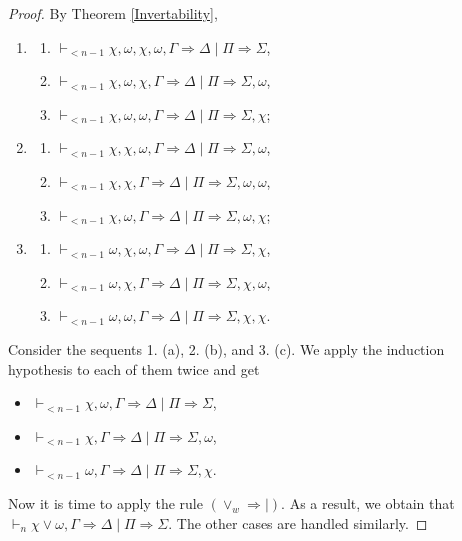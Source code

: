 \documentclass[11pt,a4paper,titlepage]{article}
\theoremstyle{definition}
\newcommand{\3}{\vspace{.3in}}
\newcommand{\2}{\vspace{.2in}}
\newcommand{\1}{\vspace{.1in}}
\newcommand{\5}{\vspace{.05in}}
\begin{document}
\begin{proof}
By Theorem \ref{Invertability}, \begin{enumerate}\itemsep=0pt
\item	\begin{enumerate}\itemsep=0pt
\item	$\vdash_{<n-1}  \chi,\omega,\chi,\omega,\Gamma\Rightarrow\Delta\mid \Pi\Rightarrow\Sigma $,
\item $\vdash_{<n-1}  \chi,\omega,\chi,\Gamma\Rightarrow\Delta\mid \Pi\Rightarrow\Sigma,\omega $, 
\item $\vdash_{<n-1}  \chi,\omega,\omega,\Gamma\Rightarrow\Delta\mid \Pi\Rightarrow\Sigma,\chi $;
\end{enumerate}
\item \begin{enumerate}\itemsep=0pt
\item $\vdash_{<n-1} \chi,\chi,\omega,\Gamma\Rightarrow\Delta\mid \Pi\Rightarrow\Sigma,\omega $,
\item $\vdash_{<n-1} \chi,\chi,\Gamma\Rightarrow\Delta\mid \Pi\Rightarrow\Sigma,\omega,\omega $,
\item $\vdash_{<n-1} \chi,\omega,\Gamma\Rightarrow\Delta\mid \Pi\Rightarrow\Sigma,\omega,\chi $;
\end{enumerate}
\item \begin{enumerate}\itemsep=0pt
	\item $\vdash_{<n-1} \omega,\chi,\omega,\Gamma\Rightarrow\Delta\mid \Pi\Rightarrow\Sigma,\chi $,
	\item $\vdash_{<n-1} \omega,\chi,\Gamma\Rightarrow\Delta\mid \Pi\Rightarrow\Sigma,\chi,\omega $,
	\item $\vdash_{<n-1} \omega,\omega,\Gamma\Rightarrow\Delta\mid \Pi\Rightarrow\Sigma,\chi,\chi $.	
\end{enumerate}
\end{enumerate}

Consider the sequents 1. (a), 2. (b), and 3. (c). We apply the induction hypothesis to each of them twice and get 
\begin{itemize}\itemsep=0pt
\item $\vdash_{<n-1}  \chi,\omega,\Gamma\Rightarrow\Delta\mid \Pi\Rightarrow\Sigma $,
\item $\vdash_{<n-1} \chi,\Gamma\Rightarrow\Delta\mid \Pi\Rightarrow\Sigma,\omega $,
	\item $\vdash_{<n-1} \omega,\Gamma\Rightarrow\Delta\mid \Pi\Rightarrow\Sigma,\chi$.
\end{itemize}

Now it is time to apply the rule $ (\vee_w\Rightarrow\mid) $. As a result, we obtain that $\vdash_{n}  \chi\vee\omega,\Gamma\Rightarrow\Delta\mid \Pi\Rightarrow\Sigma $. The other cases are handled similarly.
\end{proof}
\end{document}
